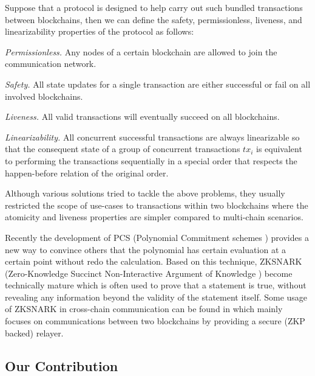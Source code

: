 Suppose that a protocol is designed to help carry out such bundled transactions between blockchains, then we can define the safety, permissionless, liveness, and linearizability properties of the protocol as follows:

\smallskip\noindent\emph{Permissionless.} Any nodes of a certain blockchain are allowed to join the communication network.

\smallskip\noindent\emph{Safety.} All state updates for a single transaction are either successful or fail on all involved blockchains.

\smallskip\noindent\emph{Liveness.} All valid transactions will eventually succeed on all blockchains.

\smallskip\noindent\emph{Linearizability.} All concurrent successful transactions are always linearizable so that the consequent state of a group of concurrent transactions $tx_i$ is equivalent to performing the transactions sequentially in a special order that respects the happen-before relation of the original order.

Although various solutions tried to tackle the above problems, they usually restricted the scope of use-cases to transactions within two blockchains where the atomicity and liveness properties are simpler compared to multi-chain scenarios.

Recently the development of PCS (Polynomial Commitment schemes \cite{boneh2020halo-pcs,boneh2020efficient-pcs,kate2010polynomial-pcs}) provides a new way to convince others that the polynomial has certain evaluation at a certain point without redo the calculation. Based on this technique, ZKSNARK (Zero-Knowledge Succinct Non-Interactive Argument of Knowledge \cite{petkus2019and, groth2016size-scheme,chiesa2020marlin-scheme, gong2022analysis-scheme, setty2020spartan-scheme, fiore2016security-scheme}) become technically mature which is often used to prove that a statement is true, without revealing any information beyond the validity of the statement itself. Some usage of ZKSNARK in cross-chain communication can be found in \cite{sidechainzkp, cao2020-zk-atomic, garoffolo2020zendoo} which mainly focuses on communications between two blockchains by providing a secure (ZKP backed) relayer.

\subsection{Our Contribution}

